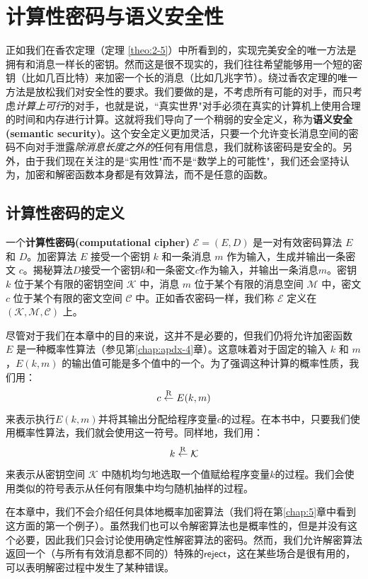 \section{计算性密码与语义安全性}

正如我们在香农定理（定理 \ref{theo:2-5}）中所看到的，实现完美安全的唯一方法是拥有和消息一样长的密钥。然而这是很不现实的，我们往往希望能够用一个短的密钥（比如几百比特）来加密一个长的消息（比如几兆字节）。绕过香农定理的唯一方法是放松我们对安全性的要求。我们要做的是，不考虑所有可能的对手，而只考虑\emph{计算上可行}的对手，也就是说，``真实世界"对手必须在真实的计算机上使用合理的时间和内存进行计算。这就将我们导向了一个稍弱的安全定义，称为\textbf{语义安全(semantic security)}。这个安全定义更加灵活，只要一个允许变长消息空间的密码不向对手泄露\emph{除消息长度之外的}任何有用信息，我们就称该密码是安全的。另外，由于我们现在关注的是``实用性"而不是``数学上的可能性"，我们还会坚持认为，加密和解密函数本身都是有效算法，而不是任意的函数。

\subsection{计算性密码的定义}\label{subsec:2-2-1}

一个\textbf{计算性密码(computational cipher)} $\mathcal{E}=(E,D)$ 是一对有效密码算法 $E$ 和 $D$。加密算法 $E$ 接受一个密钥 $k$ 和一条消息 $m$ 作为输入，生成并输出一条密文 $c$。揭秘算法$D$接受一个密钥$k$和一条密文$c$作为输入，并输出一条消息$m$。密钥 $k$ 位于某个有限的密钥空间 $\mathcal{K}$ 中，消息 $m$ 位于某个有限的消息空间 $\mathcal{M}$ 中，密文 $c$ 位于某个有限的密文空间 $\mathcal{C}$ 中。正如香农密码一样，我们称 $\mathcal{E}$ 定义在 $(\mathcal{K},\mathcal{M},\mathcal{C})$ 上。

尽管对于我们在本章中的目的来说，这并不是必要的，但我们仍将允许加密函数 $E$ 是一种概率性算法（参见第\ref{chap:apdx-4}章）。这意味着对于固定的输入 $k$ 和 $m$，$E(k,m)$ 的输出值可能是多个值中的一个。为了强调这种计算的概率性质，我们用：
$$
c\overset{\rm R}\leftarrow E(k,m)
$$
来表示执行$E(k,m)$并将其输出分配给程序变量$c$的过程。在本书中，只要我们使用概率性算法，我们就会使用这一符号。同样地，我们用：
$$
k\overset{\rm R}\leftarrow\mathcal{K}
$$
来表示从密钥空间 $\mathcal{K}$ 中随机均匀地选取一个值赋给程序变量$k$的过程。我们会使用类似的符号表示从任何有限集中均匀随机抽样的过程。

在本章中，我们不会介绍任何具体地概率加密算法（我们将在第\ref{chap:5}章中看到这方面的第一个例子）。虽然我们也可以令解密算法也是概率性的，但是并没有这个必要，因此我们只会讨论使用确定性解密算法的密码。然而，我们允许解密算法返回一个（与所有有效消息都不同的）特殊的$\mathsf{reject}$，这在某些场合是很有用的，可以表明解密过程中发生了某种错误。

